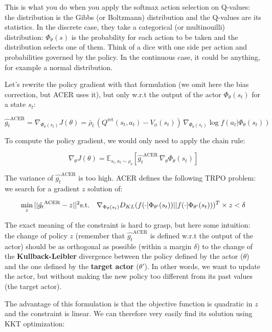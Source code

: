 \documentclass[
  letterpaper,
  DIV=11,
  numbers=noendperiod]{scrreprt}
\begin{document}
This is what you do when you apply the softmax action selection on
Q-values: the distribution is the Gibbs (or Boltzmann) distribution and
the Q-values are its statistics. In the discrete case, they take a
categorical (or multinouilli) distribution: \(\Phi_\theta(s)\) is the
probability for each action to be taken and the distribution selects one
of them. Think of a dice with one side per action and probabilities
governed by the policy. In the continuous case, it could be anything,
for example a normal distribution.

Let's rewrite the policy gradient with that formulation (we omit here
the bias correction, but ACER uses it), but only w.r.t the output of the
actor \(\Phi_\theta(s_t)\) for a state \(s_t\):

\[
    \hat{g_t}^\text{ACER} = \nabla_{\Phi_\theta(s_t)} J(\theta)  = \bar{\rho}_t \, (Q^\text{ret}(s_t, a_t) - V_\phi(s_t) ) \, \nabla_{\Phi_\theta(s_t)} \log f(a_t | \Phi_\theta(s_t))
\]

To compute the policy gradient, we would only need to apply the chain
rule:

\[
    \nabla_\theta J(\theta) = \mathbb{E}_{s_t, a_t \sim \rho_b} [ \hat{g_t}^\text{ACER} \, \nabla_\theta \Phi_\theta(s_t) ]
\]

The variance of \(\hat{g_t}^\text{ACER}\) is too high. ACER defines the
following TRPO problem: we search for a gradient \(z\) solution of:

\[
    \min_z ||\hat{g_t}^\text{ACER} - z ||^2 \\
    \text{s.t.} \quad \nabla_{\Phi_\theta(s_t)} D_{KL}( f(\cdot | \Phi_{\theta'}(s_t) ) || f(\cdot | \Phi_{\theta'}(s_t)) )^T \times z < \delta
\]

The exact meaning of the constraint is hard to grasp, but here some
intuition: the change of policy \(z\) (remember that
\(\hat{g_t}^\text{ACER}\) is defined w.r.t the output of the actor)
should be as orthogonal as possible (within a margin \(\delta\)) to the
change of the \textbf{Kullback-Leibler} divergence between the policy
defined by the actor (\(\theta\)) and the one defined by the
\textbf{target actor} (\(\theta'\)). In other words, we want to update
the actor, but without making the new policy too different from its past
values (the target actor).

The advantage of this formulation is that the objective function is
quadratic in \(z\) and the constraint is linear. We can therefore very
easily find its solution using KKT optimization:
\end{document}
